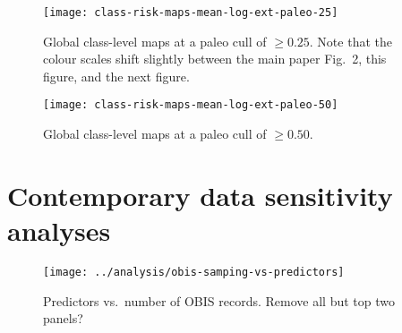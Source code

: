 \documentclass[11pt]{article}
\begin{document}
\begin{figure}[htbp]
\begin{center}
\texttt{[image: class-risk-maps-mean-log-ext-paleo-25]}
\caption{Global class-level maps at a paleo cull of $\ge 0.25$. Note that the colour scales shift slightly between the main paper Fig.\ 2, this figure, and the next figure.}
\label{fig:class-maps-paleo-cull-0.25}
\end{center}
\end{figure}

\begin{figure}[htbp]
\begin{center}
\texttt{[image: class-risk-maps-mean-log-ext-paleo-50]}
\caption{Global class-level maps at a paleo cull of $\ge 0.50$.}
\label{fig:class-maps-paleo-cull-0.50}
\end{center}
\end{figure}

\clearpage

\section{Contemporary data sensitivity analyses}

\begin{figure}[htbp]
\begin{center}
\texttt{[image: ../analysis/obis-samping-vs-predictors]}
\caption{Predictors vs.\ number of OBIS records. Remove all but top two panels?}
\label{fig:obis-sampling-vs-predictors}
\end{center}
\end{figure}

\clearpage

%

\end{document}
